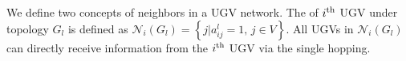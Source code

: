 	We define two concepts of neighbors in a UGV network.
	The \textit{\dnbhd} of $i^\text{th}$ UGV under topology $G_{l}$ is defined as $\mathcal{N}_i(G_{l})=\left\lbrace j|a^l_{ij}=1,\,j\in V\right\rbrace $. %
	All UGVs in $\mathcal{N}_i(G_{l})$ can directly receive information from the $i^\text{th}$ UGV via the single hopping.
		
	
	
